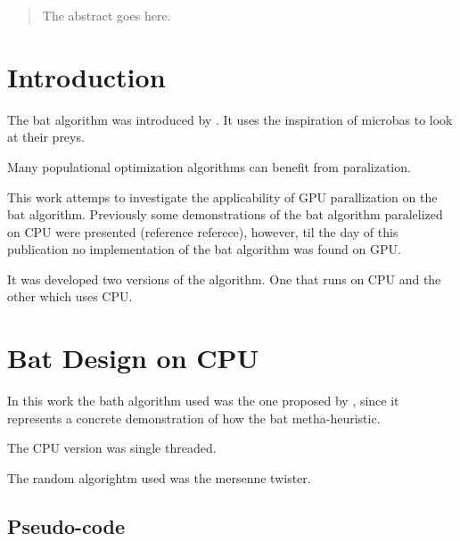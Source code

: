 \documentclass[conference]{IEEEtran}
\begin{document}
\begin{abstract}
The abstract goes here.
\end{abstract}





%
\IEEEpeerreviewmaketitle



\section{Introduction}


The bat algorithm was introduced by \cite{original}. It uses the inspiration of microbas to look at their preys.

Many populational optimization algorithms can benefit from paralization.

This work attemps to investigate the applicability of GPU parallization
on the bat algorithm. Previously some demonstrations of the bat
algorithm paralelized on CPU were presented (reference referece),
however, til the day of this publication no implementation of the bat
algorithm was found on GPU.

It was developed two versions of the algorithm. One that runs on CPU and
the other which uses CPU.

\section{Bat Design on CPU}

In this work the bath algorithm used was the one proposed by
\cite{parpinelli}, since it represents a concrete demonstration of how
the bat metha-heuristic.

The CPU version was single threaded.

The random algorightm used was the mersenne twister.

\subsection{Pseudo-code}
\end{document}
